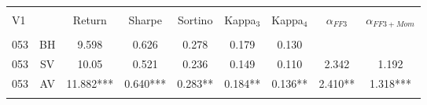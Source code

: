 
\begin{tabular}{@{\extracolsep{5pt}} Hcccccccc} 
\\[-1.8ex]\hline 
\hline \\[-1.8ex] 
V1 &  & Return & Sharpe & Sortino & Kappa$_{3}$ & Kappa$_{4}$ & $\alpha_{FF3}$ & $\alpha_{FF3+Mom}$ \\ 
\hline \\[-1.8ex] 
053 & BH & 9.598 & 0.626 & 0.278 & 0.179 & 0.130 &  &  \\ 
053 & SV & 10.05 & 0.521 & 0.236 & 0.149 & 0.110 & 2.342 & 1.192 \\ 
053 & AV & 11.882*** & 0.640*** & 0.283** & 0.184** & 0.136** & 2.410** & 1.318*** \\ 
\hline \\[-1.8ex] 
\end{tabular} 
